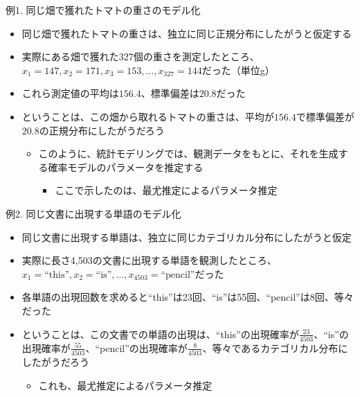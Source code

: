 \documentclass[aspectratio=169,unicode,dvipdfmx,14pt]{beamer}
\begin{document}
\begin{frame}{例1. 同じ畑で獲れたトマトの重さのモデル化}
\begin{itemize}
\item 同じ畑で獲れたトマトの重さは、独立に同じ正規分布にしたがうと仮定する
\item 実際にある畑で獲れた327個の重さを測定したところ、$x_1=147, x_2=171, x_3=153, \ldots, x_{327}=144$だった（単位g）
\item これら測定値の平均は$156.4$、標準偏差は$20.8$だった
\item ということは、この畑から取れるトマトの重さは、平均が$156.4$で標準偏差が$20.8$の正規分布にしたがうだろう
\begin{itemize}
\item このように、統計モデリングでは、観測データをもとに、それを生成する確率モデルのパラメータを推定する
\begin{itemize}
\item ここで示したのは、最尤推定によるパラメータ推定
\end{itemize}
\end{itemize}
\end{itemize}
\end{frame}

\begin{frame}{例2. 同じ文書に出現する単語のモデル化}
\begin{itemize}
\item 同じ文書に出現する単語は、独立に同じカテゴリカル分布にしたがうと仮定
\item 実際に長さ4,503の文書に出現する単語を観測したところ、$x_1=\mbox{``this''}, x_2=\mbox{``is''}, \ldots, x_{4503}=\mbox{``pencil''}$だった
\item 各単語の出現回数を求めると``this''は23回、``is''は55回、``pencil''は8回、等々だった
\item ということは、この文書での単語の出現は、``this''の出現確率が$\frac{23}{4503}$、``is''の出現確率が$\frac{55}{4503}$、``pencil''の出現確率が$\frac{8}{4503}$、等々であるカテゴリカル分布にしたがうだろう
\begin{itemize}
\item これも、最尤推定によるパラメータ推定
\end{itemize}
\end{itemize}
\end{frame}
\end{document}
